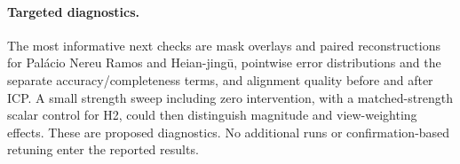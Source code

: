 \paragraph{Targeted diagnostics.}
The most informative next checks are mask overlays and paired reconstructions for Pal\'acio Nereu Ramos and Heian-jing\={u}, pointwise error distributions and the separate accuracy/completeness terms, and alignment quality before and after ICP. A small strength sweep including zero intervention, with a matched-strength scalar control for H2, could then distinguish magnitude and view-weighting effects. These are proposed diagnostics. No additional runs or confirmation-based retuning enter the reported results.
